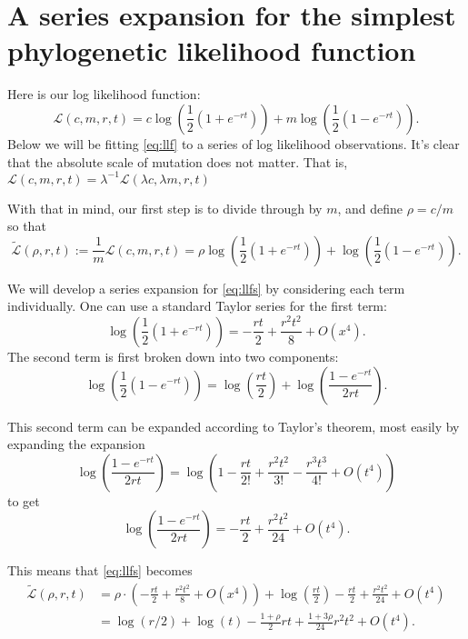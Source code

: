 \documentclass{amsart}
\newcommand{\llf}{\mathcal{L}}   %
\newcommand{\llfs}{\tilde{\llf}}
\begin{document}
\section{A series expansion for the simplest phylogenetic likelihood function}

Here is our log likelihood function:
\begin{equation}
  \llf(c,m,r,t) = c \log\left(\frac{1}{2}(1+e^{-rt})\right) + m \log\left(\frac{1}{2}(1-e^{-rt})\right).
  \label{eq:llf}
\end{equation}
Below we will be fitting \eqref{eq:llf} to a series of log likelihood observations.
It's clear that the absolute scale of mutation does not matter.
That is, $\llf(c,m,r,t) = \lambda^{-1} \llf(\lambda c,\lambda m,r,t)$

With that in mind, our first step is to divide through by $m$, and define $\rho = c/m$ so that
\begin{equation}
  \llfs(\rho,r,t) := \frac{1}{m} \llf(c,m,r,t) = \rho \log \left(\frac{1}{2}(1+e^{-rt})\right) + \log \left(\frac{1}{2}(1-e^{-rt})\right).
  \label{eq:llfs}
\end{equation}

We will develop a series expansion for \eqref{eq:llfs} by considering each term individually.
One can use a standard Taylor series for the first term:
\begin{equation}
  \log \left(\frac{1}{2}(1+e^{-rt})\right) = - \frac{rt}{2} + \frac{r^2 t^2}{8} + O(x^4).
\end{equation}
The second term is first broken down into two components:
\begin{equation}
  \log \left(\frac{1}{2}(1-e^{-rt})\right) = \log \left(\frac{rt}{2} \right) + \log \left(\frac{1-e^{-rt}}{2 rt}\right).
\end{equation}

This second term can be expanded according to Taylor's theorem, most easily by expanding the expansion
\[
  \log \left(\frac{1-e^{-rt}}{2 rt}\right) = \log \left(1 - \frac{rt}{2!} + \frac{r^2 t^2}{3!} - \frac{r^3 t^3}{4!} + O(t^4) \right)
\]
to get
\[
  \log \left(\frac{1-e^{-rt}}{2 rt}\right) = - \frac{rt}{2} + \frac{r^2 t^2}{24} + O(t^4).
\]

This means that \eqref{eq:llfs} becomes
\[
  \begin{split}
    \llfs(\rho,r,t) & = \rho \cdot \left(-\frac{rt}{2} + \frac{r^2 t^2}{8} + O(x^4) \right) + \log \left(\frac{rt}{2} \right) - \frac{rt}{2} + \frac{r^2 t^2}{24} + O(t^4)\\
    & = \log(r/2) + \log(t) - \frac{1+\rho}{2} r t + \frac{1+3 \rho}{24} r^2 t^2 + O(t^4).
  \end{split}
\]
\end{document}
